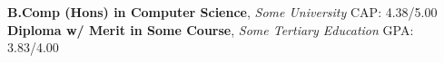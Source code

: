 %
%
%


\begin{education}
					{\textbf{B.Comp (Hons) in Computer Science}, \textit{Some University}}
	\educationentry{} {CAP: 4.38/5.00}
					{\textbf{Diploma w/ Merit in Some Course}, \textit{Some Tertiary Education}}
	\educationentry{} {GPA: 3.83/4.00}
\end{education}
